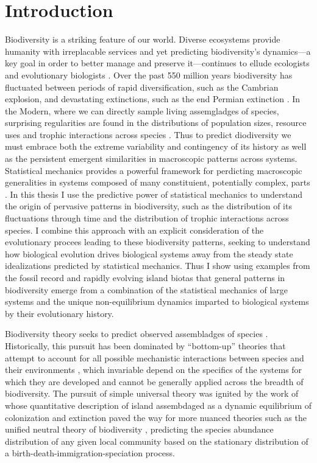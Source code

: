 \chapter*{Introduction}


Biodiversity is a striking feature of our world. Diverse ecosystems
provide humanity with irreplacable services \citep{dailyETC} and yet
predicting biodiversity's dynamics---a key goal in order to better
manage and preserve it---continues to ellude ecologists and
evolutionary biologists \citep{mcgill, somePaleo}. Over the past 550
million years biodiversity has fluctuated between periods of rapid
diversification, such as the Cambrian explosion, and devastating
extinctions, such as the end Permian extinction \citep{sepk,
  alroy}. In the Modern, where we can directly sample living
assemgladges of species, surprising regularities are found in the
distributions of population sizes, resource uses and trophic
interactions across species \citep{hubbell, nekola, harte, martinez,
  bascompte}. Thus to predict diodiversity we must embrace both the
extreme variability and contingency of its history as well as the
persistent emergent similarities in macroscopic patterns across
systems. Statistical mechanics provides a powerful framework for
perdicting macroscopic generalities in systems composed of many
constituient, potentially complex, parts \citep{}.  In this thesis I
use the predictive power of statistical mechanics to understand the
origin of pervasive patterns in biodiversity, such as the distribution
of its fluctuations through time and the distribution of trophic
interactions across species.  I combine this approach with an explicit
consideration of the evolutionary procees leading to these
biodiversity patterns, seeking to understand how biological evolution
drives biological systems away from the steady state idealizations
predicted by statistical mechanics.  Thus I show using examples from
the fossil record and rapidly evolving island biotas that general
patterns in biodiversity emerge from a combination of the statistical
mechanics of large systems and the unique non-equilibrium dynamics
imparted to biological systems by their evolutionary history.

Biodiversity theory seeks to predict observed assembladges of species
\citep{hubbell2001}. Historically, this pursuit has been dominated by
``bottom-up'' theories that attempt to account for all possible
mechanistic interactions between species and their environments
\citep{haegeman2008}, which invariable depend on the specifics of the
systems for which they are developed and cannot be generally applied
across the breadth of biodiversity.  The pursuit of simple universal
theory was ignited by the work of \citet{macWilson} whose quantitative
description of island assembdaged as a dynamic equilibrium of
colonization and extinction paved the way for more nuanced theories
such as the unified neutral theory of biodiversity
\citep{hubbell2001}, predicting the species abundance distribution of
any given local community based on the stationary distribution of a
birth-death-immigration-speciation process.

